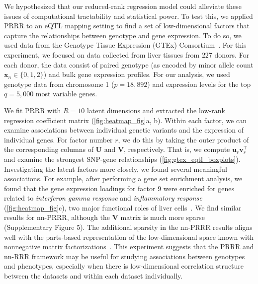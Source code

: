 \documentclass{bmcart}
\begin{document}
We hypothesized that our reduced-rank regression model could alleviate these issues of computational tractability and statistical power. To test this, we applied PRRR to an eQTL mapping setting to find a set of low-dimensional factors that capture the relationships between genotype and gene expression. To do so, we used data from the Genotype Tissue Expression (GTEx) Consortium~\citep{gtex2020gtex}. For this experiment, we focused on data collected from liver tissues from $227$ donors. For each donor, the data consist of paired genotype (as encoded by minor allele count $\mathbf{x}_n \in \{0, 1, 2\}$) and bulk gene expression profiles. For our analysis, we used genotype data from chromosome 1 ($p=18,892$) and expression levels for the top $q=5,000$ most variable genes.

We fit PRRR with $R=10$ latent dimensions and extracted the low-rank regression coefficient matrix (\autoref{fig:heatmap_fig}a, b). Within each factor, we can examine associations between individual genetic variants and the expression of individual genes. For factor number $r$, we do this by taking the outer product of the corresponding columns of $\mathbf{U}$ and $\mathbf{V}$, respectively. That is, we compute $\mathbf{u}_r \mathbf{v}_r^\top$ and examine the strongest SNP-gene relationships (\autoref{fig:gtex_eqtl_boxplots}). Investigating the latent factors more closely, we found several meaningful associations. For example, after performing a gene set enrichment analysis, we found that the gene expression loadings for factor 9 were enriched for genes related to \emph{interferon gamma response} and \emph{inflammatory response} (\autoref{fig:heatmap_fig}c), two major functional roles of liver cells~\citep{horras2011regulation,robinson2016liver}.
We find similar results for nn-PRRR, although the $\mathbf{V}$ matrix is much more sparse (Supplementary Figure 5). 
The additional sparsity in the nn-PRRR results aligns well with the parts-based representation of the low-dimensional space known with nonnegative matrix factorizations~\citep{lee1999learning,donoho2003does,townes2021}.
This experiment suggests that the PRRR and nn-RRR framework may be useful for studying associations between genotypes and phenotypes, especially when there is low-dimensional correlation structure between the datasets and within each dataset individually.
\end{document}
